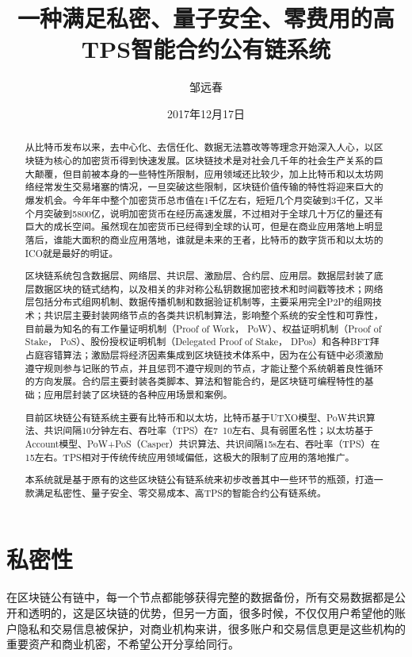 \documentclass[UTF8]{ctexart}
\title{一种满足私密、量子安全、零费用的高TPS智能合约公有链系统} \author{邹远春} \date{2017年12月17日}
\begin{document}
\maketitle \tableofcontents

\begin{abstract}

从比特币发布以来，去中心化、去信任化、数据无法篡改等等理念开始深入人心，以区块链为核心的加密货币得到快速发展。区块链技术是对社会几千年的社会生产关系的巨大颠覆，但目前被本身的一些特性所限制，应用领域还比较少，加上比特币和以太坊网络经常发生交易堵塞的情况，一旦突破这些限制，区块链价值传输的特性将迎来巨大的爆发机会。今年年中整个加密货币总市值在1千亿左右，短短几个月突破到3千亿，又半个月突破到5800亿，说明加密货币在经历高速发展，不过相对于全球几十万亿的量还有巨大的成长空间。虽然现在加密货币已经得到全球的认可，但是在商业应用落地上明显落后，谁能大面积的商业应用落地，谁就是未来的王者，比特币的数字货币和以太坊的ICO就是最好的明证。

区块链系统包含数据层、网络层、共识层、激励层、合约层、应用层。数据层封装了底层数据区块的链式结构，以及相关的非对称公私钥数据加密技术和时间戳等技术；网络层包括分布式组网机制、数据传播机制和数据验证机制等，主要采用完全P2P的组网技术；共识层主要封装网络节点的各类共识机制算法，影响整个系统的安全性和可靠性，目前最为知名的有工作量证明机制（Proof of Work， PoW）、权益证明机制（Proof of Stake， PoS）、股份授权证明机制（Delegated Proof of Stake， DPos）和各种BFT拜占庭容错算法；激励层将经济因素集成到区块链技术体系中，因为在公有链中必须激励遵守规则参与记账的节点，并且惩罚不遵守规则的节点，才能让整个系统朝着良性循环的方向发展。合约层主要封装各类脚本、算法和智能合约，是区块链可编程特性的基础；应用层封装了区块链的各种应用场景和案例。

目前区块链公有链系统主要有比特币和以太坊，比特币基于UTXO模型、PoW共识算法、共识间隔10分钟左右、吞吐率（TPS）在7~10左右、具有弱匿名性；以太坊基于Account模型、PoW+PoS（Casper）共识算法、共识间隔15s左右、吞吐率（TPS）在15左右。TPS相对于传统传统应用领域偏低，这极大的限制了应用的落地推广。

本系统就是基于原有的这些区块链公有链系统来初步改善其中一些环节的瓶颈，打造一款满足私密性、量子安全、零交易成本、高TPS的智能合约公有链系统。

\end{abstract}

\section{私密性}

在区块链公有链中，每一个节点都能够获得完整的数据备份，所有交易数据都是公开和透明的，这是区块链的优势，但另一方面，很多时候，不仅仅用户希望他的账户隐私和交易信息被保护，对商业机构来讲，很多账户和交易信息更是这些机构的重要资产和商业机密，不希望公开分享给同行。
\end{document}
